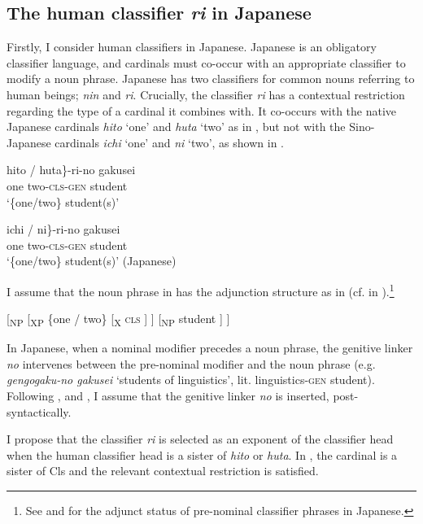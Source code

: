 \documentclass[output=paper]{langscibook}
\begin{document}
\subsection{The human classifier \textit{ri} in Japanese}\label{tat:sec:add.ja}\largerpage
Firstly, I consider human classifiers in Japanese. Japanese is an obligatory classifier language, and cardinals must co-occur with an appropriate classifier to modify a noun phrase. Japanese has two classifiers for common nouns referring to human beings; \textit{nin} and \textit{ri}. Crucially, the classifier \textit{ri} has a contextual restriction regarding the type of a cardinal it combines with. It co-occurs with the native Japanese cardinals \textit{hito} `one' and \textit{huta} `two' as in , but not with the Sino-Japanese cardinals \textit{ichi} `one' and \textit{ni} `two', as shown in .


\ea
\ea\label{tat:ex:jap.cls.selection.1.2}
\gll\minsp{\{} hito / huta\textnormal{\}}-ri-no gakusei\\  
      {} one {} two-\textsc{cls-gen} student\\ 
\glt `\{one/two\} student(s)'

\ex
\gll \minsp{\{*} ichi / \minsp{*} ni\textnormal{\}}-ri-no gakusei\\  
      {} one {} {} two-\textsc{cls-gen} student\\ 
\glt `\{one/two\} student(s)' \hfill(Japanese)
\z\z

\noindent I assume that the noun phrase in  has the adjunction structure as in  (cf.  in ).\footnote{See \citet{SaitoMurasugi1990} and \citet{HuangOchi2014} for the adjunct status of pre-nominal classifier phrases in Japanese.}

\ea\label{tat:jap.cls}
[\textsubscript{NP} [\textsubscript{XP} \{one / two\} [\textsubscript{X} \textsc{cls} ] ] [\textsubscript{NP} student ] ]
\z

\noindent In Japanese, when a nominal modifier precedes a noun phrase, the genitive linker \textit{no} intervenes between the pre-nominal modifier and the noun phrase (e.g. \textit{gen\-go\-gaku-no gakusei} `students of linguistics', lit. linguistics-\textsc{gen} student). Following \citet{KitagawaRoss1982}, and \citet{Watanabe2006}, I assume that the genitive linker \textit{no} is inserted, post-syntactically. 

I propose that the classifier \textit{ri} is selected as an exponent of the classifier head when the human classifier head is a sister of \textit{hito} or \textit{huta}. In , the cardinal is a sister of Cls and the relevant contextual restriction is satisfied.
\end{document}
